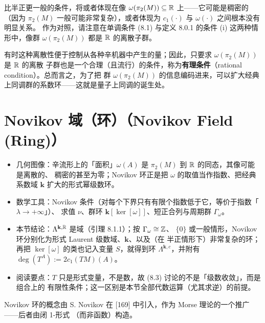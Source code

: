 比半正更一般的条件，将或者体现在像 $\omega(\pi_2(M))\subseteq\mathbb{R}$ 上——它可能是稠密的（因为
$\pi_2(M)$ 一般可能非常复杂），或者体现为 $c_1(\cdot)$ 与 $\omega(\cdot)$ 之间根本没有明显关系。
作为对照，请注意在单调条件 (8.1) 与定义 8.0.1 的条件 (i) 这两种情形中，像群
$\omega(\pi_2(M))$ 都是 $\mathbb{R}$ 的离散子群。

有时这种离散性便于控制从各种辛机器中产生的量；因此，只要求 $\omega(\pi_2(M))$ 是 $\mathbb{R}$ 的离散
子群也是一个合理（且流行）的条件，称为\textbf{有理条件}（rational condition）。总而言之，为了把
群 $\omega(\pi_2(M))$ 的信息编码进来，可以扩大经典上同调群的系数环——这就是量子上同调的诞生处。

\section{Novikov 域（环）（Novikov Field (Ring)）}

\begin{keytakeaways}
\begin{itemize}
  \item 几何图像：辛流形上的「面积」$\omega(A)$ 是 $\pi_2(M)$ 到 $\mathbb{R}$ 的同态，其像可能是离散的、
        稠密的甚至为零；Novikov 环正是把 $\omega$ 的取值当作指数、把经典系数域 $\mathbf{k}$
        扩大的形式幂级数环。
  \item 数学工具：Novikov 条件（对每个下界只有有限个指数低于它，等价于指数「$\lambda\to+\infty$」）、
        求值 $\nu$、群环 $\mathbf{k}[\ker[\omega]]$、短正合列与周期群 $\Gamma_\omega$。
  \item 本节结论：$\Lambda^{\mathbf{k},\mathbb{R}}$ 是域（引理 8.1.1）；按 $\Gamma_\omega\cong\mathbb{Z}$、
        $\{0\}$ 或一般情形，Novikov 环分别化为形式 Laurent 级数域、$\mathbf{k}$、以及（在
        半正情形下）非常复杂的环；再把 $\ker[\omega]$ 的类也记入变量 $S$，就得到环
        $\Lambda^{\mathbf{k},c}$，并附有 $\deg(T^A):=2c_1(TM)(A)$。
  \item 阅读要点：$T$ 只是形式变量，不是数，故 (8.3) 讨论的不是「级数收敛」，而是组合上的
        有限性条件；这一区别是本节全部代数运算（尤其求逆）的前提。
\end{itemize}
\end{keytakeaways}

Novikov 环的概念由 S. Novikov 在 [169] 中引入，作为 Morse 理论的一个推广——后者由闭 1-形式
（而非函数）构造。

